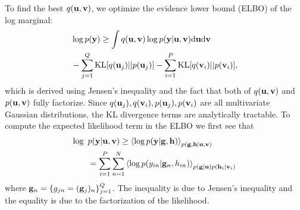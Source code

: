 \noindent
To find the best $q(\mathbf{u}, \mathbf{v})$, we  optimize the evidence lower bound (ELBO) of the log marginal:
\begin{align}
\nonumber
&\log p(\mathbf{y}) \ge \int q(\mathbf{u}, \mathbf{v}) \log p(\mathbf{y} | \mathbf{u}, \mathbf{v})  \mathrm{d} \mathbf{u} \mathrm{d} \mathbf{v} \\
&- \sum_{j=1}^Q \text{KL}[q(\mathbf{u}_j) || p(\mathbf{u}_j)] - \sum_{i=1}^P \text{KL}[q(\mathbf{v}_i) || p(\mathbf{v}_i)],
\label{eq:elbo}
\end{align}
which is derived using Jensen's inequality and the fact that both of $q(\mathbf{u}, \mathbf{v})$ and $p(\mathbf{u}, \mathbf{v})$ fully factorize.
Since $q(\mathbf{u}_j), q(\mathbf{v}_i), p(\mathbf{u}_j), p(\mathbf{v}_i)$ are all multivariate Gaussian distributions, the KL divergence terms are analytically tractable.
To compute the expected likelihood term in the ELBO we first see that
\begin{align}
\nonumber
\log \text{ } &p(\mathbf{y} | \mathbf{u}, \mathbf{v})
\ge \left\langle \log p(\mathbf{y} | \mathbf{g}, \mathbf{h}) \right\rangle_{p(\mathbf{g},\mathbf{h} | \mathbf{u}, \mathbf{v})}  \\
&= \sum_{i=1}^P \sum_{n=1}^N \left\langle \log p(y_{in} | \mathbf{g}_n, h_{in})  \right\rangle_{p(\mathbf{g} | \mathbf{u}) p(\mathbf{h}_i | \mathbf{v}_i)} 
\end{align}
where $\mathbf{g}_n = \{g_{jn} = (\mathbf{g}_j)_n\}_{j=1}^Q$.
The inequality is due to Jensen's inequality and the equality is due to %
the factorization of the likelihood. 
\newcommand{\Ahi}{\A^h_i}
\newcommand{\Zi}{\Z_i}


